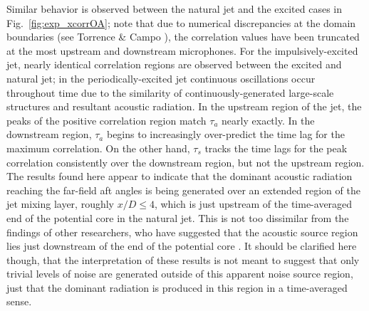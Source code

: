 \documentclass[english]{aiaa-tc}
\newcommand*{\fig}[1]{Fig.~\ref{#1}}
\begin{document}
Similar behavior is observed between the natural jet and the excited cases in \fig{fig:exp_xcorrOA}; note that due to numerical discrepancies at the domain boundaries (see Torrence \& Campo \cite{Torrence1998}), the correlation values have been truncated at the most upstream and downstream microphones.
For the impulsively-excited jet, nearly identical correlation regions are observed between the excited and natural jet; in the periodically-excited jet continuous oscillations occur throughout time due to the similarity of continuously-generated large-scale structures and resultant acoustic radiation.
In the upstream region of the jet, the peaks of the positive correlation region match $\tau_a$ nearly exactly.
In the downstream region, $\tau_a$ begins to increasingly over-predict the time lag for the maximum correlation.
On the other hand, $\tau_s$ tracks the time lags for the peak correlation consistently over the downstream region, but not the upstream region.
The results found here appear to indicate that the dominant acoustic radiation reaching the far-field aft angles is being generated over an extended region of the jet mixing layer, roughly $x/D \leq 4$, which is just upstream of the time-averaged end of the potential core in the natural jet.
This is not too dissimilar from the findings of other researchers, who have suggested that the acoustic source region lies just downstream of the end of the potential core \cite{Hileman2005}.
It should be clarified here though, that the interpretation of these results is not meant to suggest that only trivial levels of noise are generated outside of this apparent noise source region, just that the dominant radiation is produced in this region in a time-averaged sense.
\end{document}
